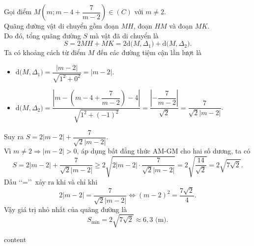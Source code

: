 \begin{ex}
{\begin{itemize}
		\end{itemize}
		Gọi điểm $M\left(m; m - 4 + \dfrac{7}{m - 2}\right) \in (C)$ với $m \neq 2$.\\
		Quãng đường vật di chuyển gồm đoạn $MH$, đoạn $HM$ và đoạn $MK$.\\
		Do đó, tổng quãng đường $S$ mà vật đã di chuyển là
		\[ S = 2MH + MK = 2\mathrm{d}\big(M, \Delta_1\big) + \mathrm{d}\big(M, \Delta_2\big). \]
		Ta có khoảng cách từ điểm $M$ đến các đường tiệm cận lần lượt là
		\begin{itemize}
			\item $\mathrm{d}\big(M, \Delta_1\big) = \dfrac{|m - 2|}{\sqrt{1^2 + 0^2}} = |m - 2|$.
			\item $ \mathrm{d}\big(M, \Delta_2\big) = \dfrac{\left|m - \left(m - 4 + \dfrac{7}{m - 2}\right) - 4\right|}{\sqrt{1^2 + (-1)^2}} = \dfrac{\left|-\dfrac{7}{m - 2}\right|}{\sqrt{2}} = \dfrac{7}{\sqrt{2}|m - 2|}$.
		\end{itemize}
		Suy ra $S = 2|m - 2| + \dfrac{7}{\sqrt{2}|m - 2|}$.\\
		Vì $m \neq 2 \Rightarrow |m - 2| > 0$, áp dụng bất đẳng thức AM-GM cho hai số dương, ta có
		\[ S = 2|m - 2| + \dfrac{7}{\sqrt{2}|m - 2|} \ge 2\sqrt{2|m - 2| \cdot \dfrac{7}{\sqrt{2}|m - 2|}} = 2\sqrt{\dfrac{14}{\sqrt{2}}} = 2\sqrt{7\sqrt{2}}. \]
		Dấu \lq\lq=\rq\rq\ xảy ra khi và chỉ khi
		\[ 2|m - 2| = \dfrac{7}{\sqrt{2}|m - 2|} \Leftrightarrow (m - 2)^2 = \dfrac{7\sqrt{2}}{4}. \]
		Vậy giá trị nhỏ nhất của quãng đường là
		\[ S_{\min} = 2\sqrt{7\sqrt{2}} \approx 6,3\text{ (m)}. \]
	}
\end{ex}
\begin{ex}
	content
\end{ex}
